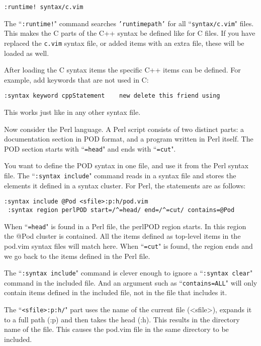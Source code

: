 \begin{Verbatim}[samepage=true]
 :runtime! syntax/c.vim
\end{Verbatim}

The ``\texttt{:runtime!}" command searches \texttt{'runtimepath'} for all ``\texttt{syntax/c.vim}" files.
This makes the C parts of the C++ syntax be defined like for C files.
If you have replaced the \texttt{c.vim} syntax file, or added items with an extra file, these will be loaded as well.

After loading the C syntax items the specific C++ items can be defined.
For example, add keywords that are not used in C:

\begin{Verbatim}[samepage=true]
 :syntax keyword cppStatement    new delete this friend using
\end{Verbatim}

This works just like in any other syntax file.

Now consider the Perl language.
A Perl script consists of two distinct parts: a documentation section in POD format, and a program written in Perl itself.
The POD section starts with ``\texttt{=head}" and ends with ``\texttt{=cut}".

You want to define the POD syntax in one file, and use it from the Perl syntax file.
The ``\texttt{:syntax include}" command reads in a syntax file and stores the elements it defined in a syntax cluster.
For Perl, the statements are as follows:

\begin{Verbatim}[samepage=true]
 :syntax include @Pod <sfile>:p:h/pod.vim
 :syntax region perlPOD start=/^=head/ end=/^=cut/ contains=@Pod
\end{Verbatim}

When ``\texttt{=head}" is found in a Perl file, the perlPOD region starts.
In this region the @Pod cluster is contained.
All the items defined as top-level items in the pod.vim syntax files will match here.
When ``\texttt{=cut}" is found, the region ends and we go back to the items defined in the Perl file.

The ``\texttt{:syntax include}" command is clever enough to ignore a ``\texttt{:syntax clear}" command in the included file.
And an argument such as ``\texttt{contains=ALL}" will only contain items defined in the included file, not in the file that includes it.

The ``\texttt{<sfile>:p:h/}" part uses the name of the current file (<sfile>), expands it to a full path (:p) and then takes the head (:h).
This results in the directory name of the file.
This causes the pod.vim file in the same directory to be included.
